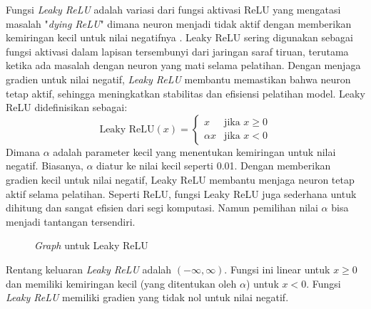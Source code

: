 Fungsi \textit{Leaky ReLU} adalah variasi dari fungsi aktivasi ReLU yang mengatasi masalah "\textit{dying ReLU}" dimana neuron menjadi tidak aktif dengan memberikan kemiringan kecil untuk nilai negatifnya \cite{Kelleher2019-cj}. Leaky ReLU sering digunakan sebagai fungsi aktivasi dalam lapisan tersembunyi dari jaringan saraf tiruan, terutama ketika ada masalah dengan neuron yang mati selama pelatihan. Dengan menjaga gradien untuk nilai negatif, \textit{Leaky ReLU} membantu memastikan bahwa neuron tetap aktif, sehingga meningkatkan stabilitas dan efisiensi pelatihan model. Leaky ReLU didefinisikan sebagai:
\begin{equation}
    \text{Leaky ReLU}(x) = 
    \begin{cases} 
    x & \text{jika } x \geq 0 \\
    \alpha x & \text{jika } x < 0 
    \end{cases}
\end{equation}
Dimana \(\alpha\) adalah parameter kecil yang menentukan kemiringan untuk nilai negatif. Biasanya, \(\alpha\) diatur ke nilai kecil seperti 0.01. Dengan memberikan gradien kecil untuk nilai negatif, Leaky ReLU membantu menjaga neuron tetap aktif selama pelatihan. Seperti ReLU, fungsi Leaky ReLU juga sederhana untuk dihitung dan sangat efisien dari segi komputasi. Namun pemilihan nilai \(\alpha\) bisa menjadi tantangan tersendiri.
\begin{figure}[H]
    \centering
    \caption{\textit{Graph} untuk Leaky ReLU}
    \label{fig:enter-label}
\end{figure}

Rentang keluaran \textit{Leaky ReLU} adalah \((-\infty, \infty)\). Fungsi ini linear untuk \(x \geq 0\) dan memiliki kemiringan kecil (yang ditentukan oleh \(\alpha\)) untuk \(x < 0\). Fungsi \textit{Leaky ReLU} memiliki gradien yang tidak nol untuk nilai negatif.

